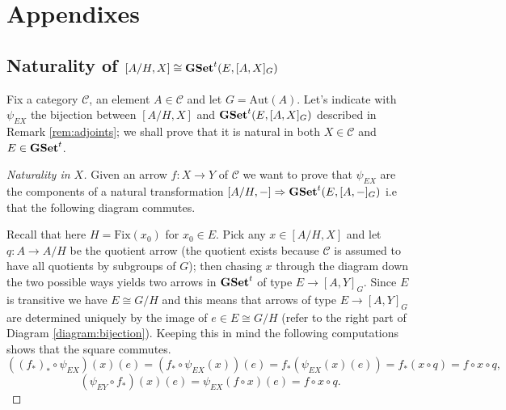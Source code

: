 \documentclass[italian, 12pt, reqno]{article}
\theoremstyle{myteo}
\numberwithin{equation}{section}
\newcommand{\cat}[1]{\mathscr{#1}}
\newcommand{\aut}{\text{Aut}}
\newcommand{\tgset}{\text{\textbf{GSet}}^t}
\newcommand{\fix}[1]{\text{Fix}(#1)}
\newcommand{\homs}[2]{[#1, #2]}
\newcommand{\fun}[3]{#1\colon#2\to #3}
\begin{document}
\section{Appendixes}
\label{sec:appendixes}

\subsection{Naturality of \(\homs{A/H}{X} \cong \tgset(E, \homs{A}{X}_G)\)}
Fix a category \(\cat{C}\), an element \(A\in\cat{C}\) and let \(G = \aut(A)\).
Let's indicate with \(\psi_{EX}\) the bijection between \(\homs{A/H}{X}\) and \(\tgset(E, \homs{A}{X}_G)\) described in Remark \ref{rem:adjoints}; we shall prove that it is natural in both \(X\in\cat{C}\) and \(E\in\tgset\).

\begin{proof}[Naturality in \(X\)]
  \label{proof:naturality_in_X}
  Given an arrow \(\fun{f}{X}{Y}\) of \(\cat{C}\) we want to prove that \(\psi_{EX}\) are the components of a natural transformation \(\homs{A/H}{-}\Rightarrow \tgset(E, \homs{A}{-}_G)\) i.e that the following diagram commutes.
  \begin{center}
  \end{center}
  Recall that here \(H = \fix{x_0}\) for \(x_0\in E\).
  Pick any \(x\in \homs{A/H}{X}\) and let \(\fun{q}{A}{A/H}\) be the quotient arrow (the quotient exists because \(\cat{C}\) is assumed to have all quotients by subgroups of \(G\)); then chasing \(x\) through the diagram down the two possible ways yields two arrows in \(\tgset\) of type \(E\to\homs{A}{Y}_G\).
  Since \(E\) is transitive we have \(E \cong G/H\) and this means that arrows of type \(E\to\homs{A}{Y}_G\) are determined uniquely by the image of \(e\in E \cong G/H\) (refer to the right part of Diagram \ref{diagram:bijection}).
  Keeping this in mind the following computations shows that the square commutes.
  \[((f_*)_*\circ \psi_{EX})(x)(e) = (f_*\circ \psi_{EX}(x))(e) = f_*(\psi_{EX}(x)(e)) = f_*(x \circ q) = f\circ x\circ q,\]
  \[(\psi_{EY}\circ f_*)(x)(e) = \psi_{EX}(f\circ x)(e) = f\circ x\circ q.\]
\end{proof}
\end{document}
